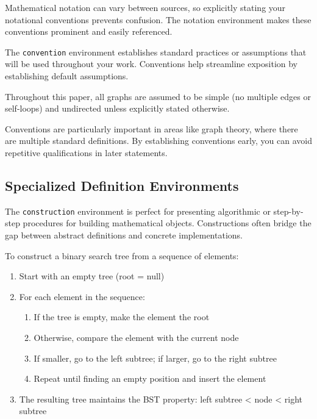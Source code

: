\documentclass[9pt]{amsart}
\begin{document}
Mathematical notation can vary between sources, so explicitly stating your
notational conventions prevents confusion. The notation environment makes these
conventions prominent and easily referenced.

The \texttt{convention} environment establishes standard practices or
assumptions that will be used throughout your work. Conventions help streamline
exposition by establishing default assumptions.

\begin{convention}
	Throughout this paper, all graphs are assumed to be simple (no multiple edges or self-loops) and undirected unless explicitly stated otherwise.
\end{convention}

Conventions are particularly important in areas like graph theory, where there
are multiple standard definitions. By establishing conventions early, you can
avoid repetitive qualifications in later statements.

\subsection{Specialized Definition Environments}

The \texttt{construction} environment is perfect for presenting algorithmic or
step-by-step procedures for building mathematical objects. Constructions often
bridge the gap between abstract definitions and concrete implementations.

\begin{construction}
	To construct a binary search tree from a sequence of elements:
	\begin{enumerate}
		\item Start with an empty tree (root = null)
		\item For each element in the sequence:
		      \begin{enumerate}
			      \item If the tree is empty, make the element the root
			      \item Otherwise, compare the element with the current node
			      \item If smaller, go to the left subtree; if larger, go to the right subtree
			      \item Repeat until finding an empty position and insert the element
		      \end{enumerate}
		\item The resulting tree maintains the BST property: left subtree < node < right
		      subtree
	\end{enumerate}
\end{construction}
\end{document}
